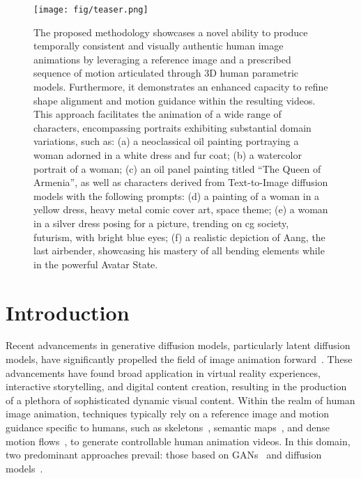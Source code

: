 \begin{figure}[!t]
  \centering
  \texttt{[image: fig/teaser.png]}
  \caption{
The proposed methodology showcases a novel ability to produce temporally consistent and visually authentic human image animations by leveraging a reference image and a prescribed sequence of motion articulated through 3D human parametric models. 
Furthermore, it demonstrates an enhanced capacity to refine shape alignment and motion guidance within the resulting videos.
This approach facilitates the animation of a wide range of characters, encompassing portraits exhibiting substantial domain variations, such as: 
(a) a neoclassical oil painting portraying a woman adorned in a white dress and fur coat;
(b) a watercolor portrait of a woman;
(c) an oil panel painting titled ``The Queen of Armenia'', as well as characters derived from Text-to-Image diffusion models with the following prompts: 
(d) a painting of a woman in a yellow dress, heavy metal comic cover art, space theme; 
(e) a woman in a silver dress posing for a picture, trending on cg society, futurism, with bright blue eyes; 
(f) a realistic depiction of Aang, the last airbender, showcasing his mastery of all bending elements while in the powerful Avatar State.}
\vspace{-5mm}
\label{fig:teaser}
\end{figure}

\section{Introduction}
\label{sec:intro}
Recent advancements in generative diffusion models, particularly latent diffusion models, have significantly propelled the field of image animation forward~\cite{yu2023bidirectionally,zhang2023adding,zhao2022thin,li2024synthesizing}. These advancements have found broad application in virtual reality experiences, interactive storytelling, and digital content creation, resulting in the production of a plethora of sophisticated dynamic visual content.
Within the realm of human image animation, techniques typically rely on a reference image and motion guidance specific to humans, such as skeletons~\cite{wang2023disco,hu2023animate}, semantic maps~\cite{siarohin2021motion,xu2023magicanimate}, and dense motion flows~\cite{zhao2022thin,karras2023dreampose}, to generate controllable human animation videos.
In this domain, two predominant approaches prevail: those based on GANs~\cite{goodfellow2014generative,mirza2014conditional} and diffusion models~\cite{ho2020denoising,song2020score}.

